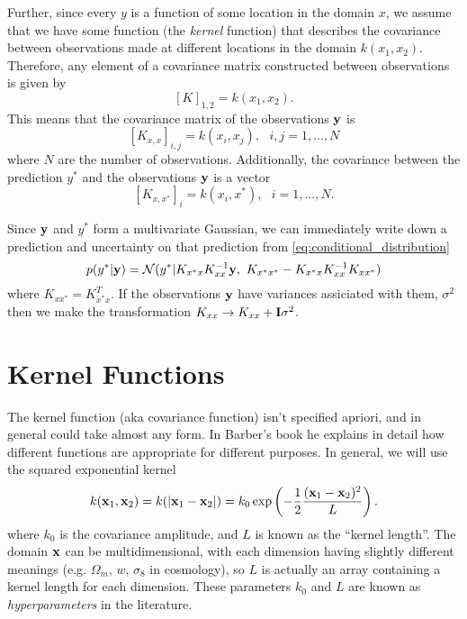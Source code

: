 \documentclass[11pt,twoside,a5paper]{article}
\newcommand{\bfx}{{\bf x}}
\newcommand{\bfy}{{\bf y}}
\newcommand{\norm}{{\cal N}}
\begin{document}
Further, since every $y$ is a function of some location in the domain $x$, we assume that we have some function (the {\it kernel} function) that describes the covariance between observations made at different locations in the domain $k(x_1,x_2)$. Therefore, any element of a covariance matrix constructed between observations is given by
\begin{equation}
  \label{eq:kernel}
  [K]_{1,2} = k(x_1,x_2).
\end{equation}
This means that the covariance matrix of the observations $\bfy$ is
\begin{equation}
  \label{eq:K_matrix}
  [K_{x,x}]_{i,j} = k(x_i,x_j),\ \ \ i,j=1,...,N
\end{equation}
where $N$ are the number of observations. Additionally, the covariance between the prediction $y^*$ and the observations $\bfy$ is a vector
\begin{equation}
  \label{eq:K_matrix}
  [K_{x,x^*}]_{i} = k(x_i,x^*),\ \ \ i=1,...,N.
\end{equation}

Since $\bfy$ and $y^*$ form a multivariate Gaussian, we can immediately write down a prediction and uncertainty on that prediction from \ref{eq:conditional_distribution}
\begin{equation}
  \label{eq:gaussian_process}
  p(y^*|\bfy) = \norm(y^* | K_{x^*x}K_{xx}^{-1}\bfy,\ 
  K_{x^*x^*} - K_{x^*x}K_{xx}^{-1}K_{xx^*})
\end{equation}
where $K_{xx^*} = K_{x^*x}^T$. If the observations $\bfy$ have variances assiciated with them, $\sigma^2$ then we make the transformation $K_{xx}\rightarrow K_{xx}+{\bf I}\sigma^2$.

\section{Kernel Functions}

The kernel function (aka covariance function) isn't specified apriori, and in general could take almost any form. In Barber's book he explains in detail how different functions are appropriate for different purposes. In general, we will use the squared exponential kernel
\begin{equation}
  \label{eq:se_kernel}
  k(\bfx_1,\bfx_2) = k(|\bfx_1-\bfx_2|) = k_0\exp\left(-\frac{1}{2}\frac{(\bfx_1-\bfx_2)^2}{L}\right).
\end{equation}
where $k_0$ is the covariance amplitude, and $L$ is known as the ``kernel length''. The domain $\bfx$ can be multidimensional, with each dimension having slightly different meanings (e.g. $\Omega_m$, $w$, $\sigma_8$ in cosmology), so $L$ is actually an array containing a kernel length for each dimension. These parameters $k_0$ and $L$ are known as {\it hyperparameters} in the literature.
\end{document}

